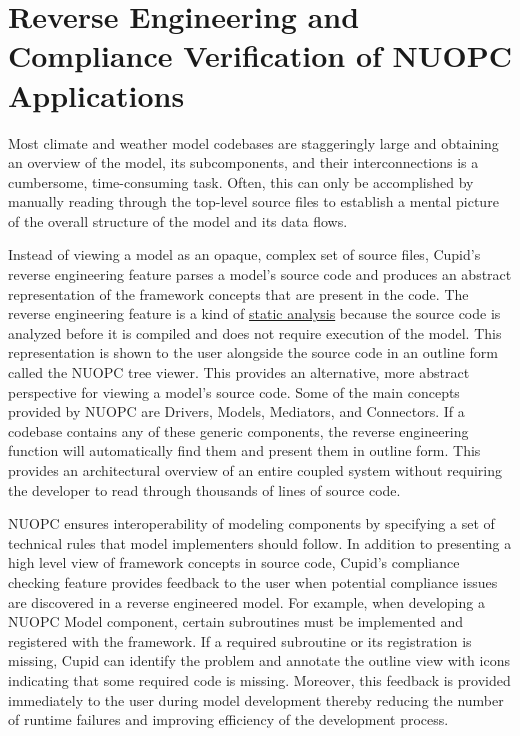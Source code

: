 \documentclass[oneside,11pt]{memoir}
\begin{document}
\chapter{Reverse Engineering and Compliance Verification of NUOPC Applications}

Most climate and weather model codebases are staggeringly large and obtaining an overview of the model, its subcomponents, and their interconnections is a cumbersome, time-consuming task. Often, this can only be accomplished by manually reading through the top-level source files to establish a mental picture of the overall structure of the model and its data flows. 

Instead of viewing a model as an opaque, complex set of source files, Cupid's reverse engineering feature parses a model's source code and produces an abstract representation of the framework concepts that are present in the code. The reverse engineering feature is a kind of \href{http://en.wikipedia.org/wiki/Static_program_analysis}{static analysis} because the source code is analyzed before it is compiled and does not require execution of the model.  This representation is shown to the user alongside the source code in an outline form called the NUOPC tree viewer. This provides an alternative, more abstract perspective for viewing a model’s source code. Some of the main concepts provided by NUOPC are Drivers, Models, Mediators, and Connectors. If a codebase contains any of these generic components, the reverse engineering function will automatically find them and present them in outline form. This provides an architectural overview of an entire coupled system without requiring the developer to read through thousands of lines of source code.

NUOPC ensures interoperability of modeling components by specifying a set of technical rules that model implementers should follow.  In addition to presenting a high level view of framework concepts in source code, Cupid’s compliance checking feature provides feedback to the user when potential compliance issues are discovered in a reverse engineered model. For example, when developing a NUOPC Model component, certain subroutines must be implemented and registered with the framework. If a required subroutine or its registration is missing, Cupid can identify the problem and annotate the outline view with icons indicating that some required code is missing. Moreover, this feedback is provided immediately to the user during model development thereby reducing the number of runtime failures and improving efficiency of the development process.
\end{document}
